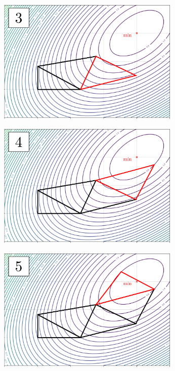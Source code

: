 \begin{figure}[H]
\begin{subfigure}[b]{0.32\textwidth}
	\end{subfigure}
	\vspace{1mm}
	\begin{subfigure}[b]{0.32\textwidth}
		\centering
		\includegraphics[width=0.96\textwidth, trim={0 0 0 0}]{figures/nelder3.pdf}
	\end{subfigure}
	\vspace{1mm}
	\begin{subfigure}[b]{0.32\textwidth}
		\centering
		\includegraphics[width=0.96\textwidth, trim={0 0 0 0}]{figures/nelder4.pdf}
	\end{subfigure}
	\begin{subfigure}[b]{0.32\textwidth}
		\centering
		\includegraphics[width=0.96\textwidth, trim={0 0 0 0}]{figures/nelder5.pdf}

\end{subfigure}
\end{figure}
